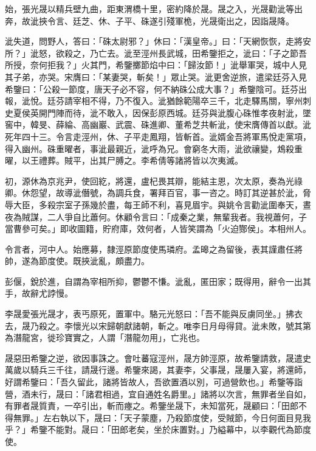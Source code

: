 \begin{pinyinscope}
 始，張光晟以精兵壁九曲，距東渭橋十里，密約降於晟。晟之入，光晟勸泚等出奔，故泚挾令言、廷芝、休、子平、硃遂引殘軍桅，光晟衛出之，因詣晟降。



 泚失道，問野人，答曰：「硃太尉邪？」休曰：「漢皇帝。」曰：「天網恢恢，走將安所？」泚怒，欲殺之，乃亡去。泚至涇州長武城，田希鑒拒之，泚曰：「子之節吾所授，奈何拒我？」火其門，希鑒擲節焰中曰：「歸汝節！」泚舉軍哭，城中人見其子弟，亦哭。宋膺曰：「某妻哭，斬矣！」眾止哭。泚更舍逆旅，遣梁廷芬入見希鑒曰：「公殺一節度，唐天子必不容，何不納硃公成大事？」希鑒陰可。廷芬出報，泚悅。廷芬請宰相不得，乃不復入。泚猶餘範陽卒三千，北走驛馬關，寧州刺史夏侯英開門陣而待，泚不敢入，因保彭原西城。廷芬與泚腹心硃惟孝夜射泚，墜窖中，韓旻、薛綸、高幽巖、武震、硃進卿、董希芝共斬泚，使宋膺傳首以獻。泚死年四十三。令言走涇州，休、子平走鳳翔，皆斬首。泚婿金吾將軍馬悅走黨項，得入幽州。硃重曜者，事泚最親近，泚呼為兄。會窮冬大雨，泚欲禳變，鴆殺重曜，以王禮葬。賊平，出其尸膊之。李希倩等諸將皆以次夷滅。



 初，源休為京兆尹，使回紇，將還，盧杞畏其辯，能結主恩，次太原，奏為光祿卿。休怨望，故導泚僭號，為調兵食，署拜百官，事一咨之。時訂其逆甚於泚，脅辱大臣，多殺宗室子孫幾於盡，每王師不利，喜見眉宇。與姚令言勸泚圍奉天，晝夜為賊謀，二人爭自比蕭何。休顧令言曰：「成秦之業，無輩我者。我視蕭何，子當曹參可矣。」即收圖籍，貯府庫，效何者，人皆笑謂為「火迫酂侯」。本相州人。



 令言者，河中人。始應募，隸涇原節度使馬璘府。孟暤之為留後，表其謹肅任將帥，遂為節度使。既挾泚亂，頗盡力。



 彭偃，銳於進，自謂為宰相所抑，鬱鬱不慊。泚亂，匿田家；既得用，辭令一出其手，故辭尤誖慢。



 李晟愛張光晟才，表丐原死，置軍中。駱元光怒曰：「吾不能與反虜同坐。」拂衣去，晟乃殺之。李懷光以宋歸朝獻諸朝，斬之。唯李日月母得貸。泚未敗，號其第為潛龍宮，徙珍寶實之，人謂「潛龍勿用」，亡兆也。



 晟惡田希鑒之逆，欲因事誅之。會吐蕃寇涇州，晟方帥涇原，故希鑒請救，晟遣史萬歲以騎兵三千往，請晟行邊。希鑒來謁，其妻李，父事晟，晟屢入宴，將還師，好謂希鑒曰：「吾久留此，諸將皆故人，吾欲置酒以別，可過營飲也。」希鑒等詣營，酒未行，晟曰：「諸君相過，宜自通姓名爵里。」諸將以次言，無罪者坐自如，有罪者晟質責，一卒引出，斬而瘞之。希鑒坐晟下，未知當死，晟顧曰：「田郎不得無罪。」左右執以下，晟曰：「天子蒙塵，乃殺節度使，受賊節，今日何面目見我乎？」希鑒不能對。晟曰：「田郎老矣，坐於床置對。」乃縊幕中，以李觀代為節度使。



\end{pinyinscope}